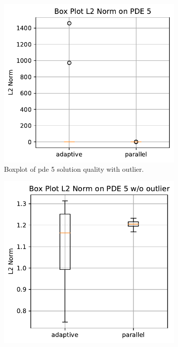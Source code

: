 \documentclass[./\jobname.tex]{subfiles}
\begin{document}
\begin{figure}[H]
	\centering
	\begin{subfigure}[b]{0.4\linewidth}
		\centering
		\includegraphics[width=1\textwidth]{../../code/experiments/experiment_2/pde5_L2_norm_boxplot.pdf}
		\caption{Boxplot of \gls{pde} 5 solution quality with outlier. }
		\label{fig:paJADE_pde5_l2norm_boxplot}
	\end{subfigure}%
	\begin{subfigure}[b]{0.39\linewidth}
		\centering
		\includegraphics[width=1\textwidth]{../../code/experiments/experiment_2/pde5_L2_norm_boxplot_wo_outlier.pdf}

\end{subfigure}
\end{figure}
\end{document}
